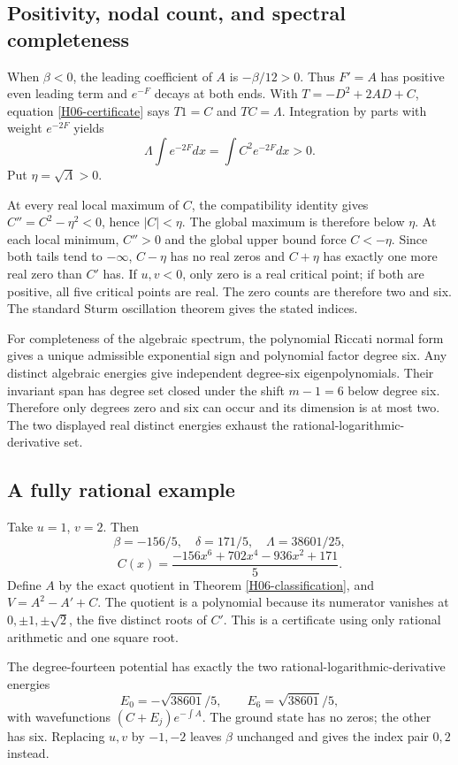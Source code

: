 \documentclass[11pt,a4paper]{article}
\theoremstyle{definition}\newtheorem{definition}[theorem]{Definition}
\theoremstyle{remark}\newtheorem{remark}[theorem]{Remark}
\numberwithin{equation}{section}
\begin{document}
\subsection{Positivity, nodal count, and spectral completeness}\label{H06-sec-5}
When $\beta<0$, the leading coefficient of $A$ is $-\beta/12>0$. Thus $F'=A$ has positive even leading term and $e^{-F}$ decays at both ends. With $T=-D^2+2AD+C$, equation \eqref{H06-certificate} says $T1=C$ and $TC=\Lambda$. Integration by parts with weight $e^{-2F}$ yields
\[\Lambda\int e^{-2F}dx=\int C^2e^{-2F}dx>0.
\]
Put $\eta=\sqrt\Lambda>0$.

At every real local maximum of $C$, the compatibility identity gives $C''=C^2-\eta^2<0$, hence $|C|<\eta$. The global maximum is therefore below $\eta$. At each local minimum, $C''>0$ and the global upper bound force $C<-\eta$. Since both tails tend to $-\infty$, $C-\eta$ has no real zeros and $C+\eta$ has exactly one more real zero than $C'$ has. If $u,v<0$, only zero is a real critical point; if both are positive, all five critical points are real. The zero counts are therefore two and six. The standard Sturm oscillation theorem gives the stated indices.

For completeness of the algebraic spectrum, the polynomial Riccati normal form gives a unique admissible exponential sign and polynomial factor degree six. Any distinct algebraic energies give independent degree-six eigenpolynomials. Their invariant span has degree set closed under the shift $m-1=6$ below degree six. Therefore only degrees zero and six can occur and its dimension is at most two. The two displayed real distinct energies exhaust the rational-logarithmic-derivative set.
\subsection{A fully rational example}\label{H06-sec-6}
Take $u=1$, $v=2$. Then
\[\beta=-156/5,\quad\delta=171/5,\quad\Lambda=38601/25,
\]
\[C(x)=\frac{-156x^6+702x^4-936x^2+171}{5}.
\]
Define $A$ by the exact quotient in Theorem \ref{H06-classification}, and $V=A^2-A'+C$. The quotient is a polynomial because its numerator vanishes at $0,\pm1,\pm\sqrt2$, the five distinct roots of $C'$. This is a certificate using only rational arithmetic and one square root.

The degree-fourteen potential has exactly the two rational-logarithmic-derivative energies
\[E_0=-\sqrt{38601}/5,\qquad E_6=\sqrt{38601}/5,
\]
with wavefunctions $(C+E_j)e^{-\int A}$. The ground state has no zeros; the other has six. Replacing $u,v$ by $-1,-2$ leaves $\beta$ unchanged and gives the index pair $0,2$ instead.
\end{document}

